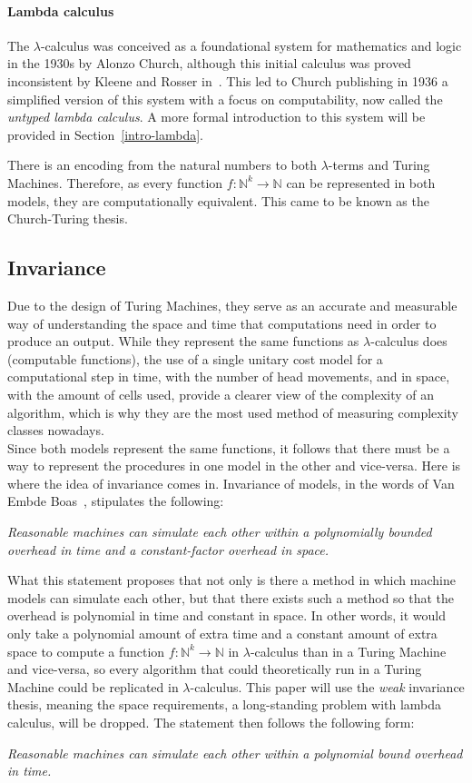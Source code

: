 \documentclass[11pt]{article}
\begin{document}
\paragraph{Lambda calculus}
The $\lambda$-calculus was conceived as a foundational system for mathematics and logic in the 1930s by Alonzo Church, although this initial calculus was proved inconsistent by Kleene and Rosser in~\cite{rosser-kleene-inconsistency}. This led to Church publishing in 1936 a simplified version of this system with a focus on computability, now called the \textit{untyped lambda calculus}. A more formal introduction to this system will be provided in Section~\ref{intro-lambda}.

There is an encoding from the natural numbers to both $\lambda$-terms and Turing Machines. Therefore, as every function $f : \mathbb{N}^k \rightarrow \mathbb{N}$ can be represented in both models, they are computationally equivalent. This came to be known as the Church-Turing thesis.
\subsection{Invariance}
Due to the design of Turing Machines, they serve as an accurate and measurable way of understanding the space and time that computations need in order to produce an output. While they represent the same functions as $\lambda$-calculus does (computable functions), the use of a single unitary cost model for a computational step in time, with the number of head movements, and in space, with the amount of cells used, provide a clearer view of the complexity of an algorithm, which is why they are the most used method of measuring complexity classes nowadays. \\
Since both models represent the same functions, it follows that there must be a way to represent the procedures in one model in the other and vice-versa. Here is where the idea of invariance comes in.
Invariance of models, in the words of Van Embde Boas~\cite{machine-models}, stipulates the following:
\begin{center}
 \textit{Reasonable machines can simulate each other within a polynomially
bounded overhead in time and a constant-factor overhead in space.}
\end{center}
What this statement proposes that not only is there a method in which machine models can simulate each other, but that there exists such a method so that the overhead is polynomial in time and constant in space. In other words, it would only take a polynomial amount of extra time and a constant amount of extra space to compute a function $f : \mathbb{N}^k \rightarrow \mathbb{N}$ in $\lambda$-calculus than in a Turing Machine and vice-versa, so every algorithm that could theoretically run in a Turing Machine could be replicated in $\lambda$-calculus.
This paper will use the \textit{weak} invariance thesis, meaning the space requirements, a long-standing problem with lambda calculus, will be dropped. The statement then follows the following form:
\begin{center}
 \textit{Reasonable machines can simulate each other within a polynomial
bound overhead in time.}
\end{center}
\end{document}
